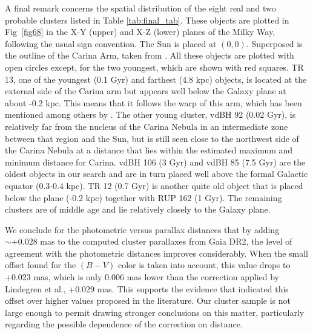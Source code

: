 \documentclass[draft]{aa}
\begin{document}
A final remark concerns the spatial distribution of the
eight real and two probable clusters listed in Table 
\ref{tab:final_tab}. These objects  are plotted in Fig~\ref{fig68} in the X-Y
(upper) and X-Z (lower) planes of the Milky Way, following the usual sign
convention. The Sun is placed at $(0, 0)$. Superposed is the outline of the
Carina Arm, taken from \cite{valle_2005}. All these objects are plotted with
open circles except, for the two youngest, which are shown with red squares. TR
13, one of the youngest (0.1 Gyr) and farthest (4.8 kpc) objects, is located at
the external side of the Carina arm but appears well below the Galaxy plane at
about -0.2 kpc. This means that it follows the warp of this arm, which has been
mentioned among others by \cite{Cersosimo_2009}.
The other young cluster, vdBH 92 (0.02 Gyr), is relatively far from the nucleus
of the Carina Nebula in an intermediate zone between that region and the Sun,
but is still seen close to the northwest side of the Carina Nebula at a
distance that lies within the estimated maximum and minimum distance for
Carina.
vdBH 106 (3 Gyr) and vdBH 85 (7.5 Gyr) are the oldest objects in our
search and are in turn placed well above the formal Galactic equator (0.3-0.4
kpc). TR 12 (0.7 Gyr) is another quite old object that is placed below the plane (-0.2
kpc) together with RUP 162 (1 Gyr). The remaining clusters are of middle age
and lie relatively closely to the Galaxy plane.

We conclude for the photometric versus parallax distances that by
adding $\sim+0.028$ mas to the computed cluster parallaxes from Gaia DR2,
the level of agreement with the photometric distances improves considerably.
When the small offset found for the $(B-V)$ color is taken into account, this
value drops to +0.023 mas, which is only 0.006 mas lower than the correction applied by
Lindegren et al., +0.029 mas.
This supports the evidence that indicated this offset over higher
values proposed in the literature. Our cluster sample is not large enough
to permit drawing stronger conclusions on this matter, particularly
regarding the possible dependence of the correction on distance.
\end{document}
